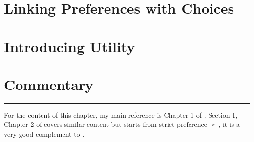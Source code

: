 \section{Linking Preferences with Choices}\label{chap1:sec3}


\section{Introducing Utility}\label{chap1:sec4}


\section{Commentary}\label{chap1:sec5}


\vspace{2.5cm}
\noindent\rule{\textwidth}{0.4pt}

For the content of this chapter, my main reference is Chapter 1 of \citet{mas1995microeconomic}. Section 1, Chapter 2 of \citet{kreps1990acourse} covers similar content but starts from strict preference $\succ$, it is a very
good complement to \citet{mas1995microeconomic}.